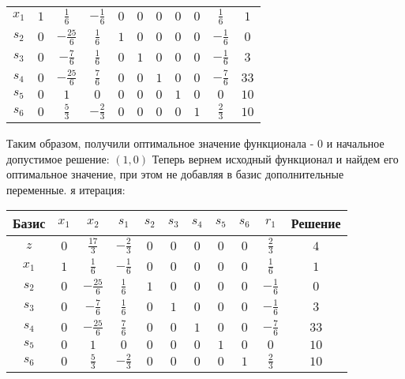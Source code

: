 \documentclass{article}%
\begin{document}
\begin{flushleft}
\begin{tabular}{|c|ccccccccc|c|}
\hline%
$x_{1}$&$1$&$\frac{1}{6}$&$-\frac{1}{6}$&$0$&$0$&$0$&$0$&$0$&$\frac{1}{6}$&$1$\\%
$s_{2}$&$0$&$-\frac{25}{6}$&$\frac{1}{6}$&$1$&$0$&$0$&$0$&$0$&$-\frac{1}{6}$&$0$\\%
$s_{3}$&$0$&$-\frac{7}{6}$&$\frac{1}{6}$&$0$&$1$&$0$&$0$&$0$&$-\frac{1}{6}$&$3$\\%
$s_{4}$&$0$&$-\frac{25}{6}$&$\frac{7}{6}$&$0$&$0$&$1$&$0$&$0$&$-\frac{7}{6}$&$33$\\%
$s_{5}$&$0$&$1$&$0$&$0$&$0$&$0$&$1$&$0$&$0$&$10$\\%
$s_{6}$&$0$&$\frac{5}{3}$&$-\frac{2}{3}$&$0$&$0$&$0$&$0$&$1$&$\frac{2}{3}$&$10$\\%
\hline%
\end{tabular}%
\newline%
\newline%
Таким образом, получили оптимальное значение функционала {-} 0 и начальное допустимое решение: %
$(1, 0)$%
\newline%
Теперь вернем исходный функционал и найдем его оптимальное значение, при этом не добавляя в базис дополнительные переменные.%
я итерация: %
\newline%
\newline%
\renewcommand{\arraystretch}{1.3}%
\begin{tabular}{|c|ccccccccc|c|}%
\hline%
Базис&$x_{1}$&$x_{2}$&$s_{1}$&$s_{2}$&$s_{3}$&$s_{4}$&$s_{5}$&$s_{6}$&$r_{1}$&Решение\\%
\hline%
$z$&$0$&$\frac{17}{3}$&$-\frac{2}{3}$&$0$&$0$&$0$&$0$&$0$&$\frac{2}{3}$&$4$\\%
\hline%
$x_{1}$&$1$&$\frac{1}{6}$&$-\frac{1}{6}$&$0$&$0$&$0$&$0$&$0$&$\frac{1}{6}$&$1$\\%
$s_{2}$&$0$&$-\frac{25}{6}$&$\frac{1}{6}$&$1$&$0$&$0$&$0$&$0$&$-\frac{1}{6}$&$0$\\%
$s_{3}$&$0$&$-\frac{7}{6}$&$\frac{1}{6}$&$0$&$1$&$0$&$0$&$0$&$-\frac{1}{6}$&$3$\\%
$s_{4}$&$0$&$-\frac{25}{6}$&$\frac{7}{6}$&$0$&$0$&$1$&$0$&$0$&$-\frac{7}{6}$&$33$\\%
$s_{5}$&$0$&$1$&$0$&$0$&$0$&$0$&$1$&$0$&$0$&$10$\\%
$s_{6}$&$0$&$\frac{5}{3}$&$-\frac{2}{3}$&$0$&$0$&$0$&$0$&$1$&$\frac{2}{3}$&$10$\\%
\hline%
\end{tabular}%
\newline%
\newline%
\newline%

\end{flushleft}
\end{document}
